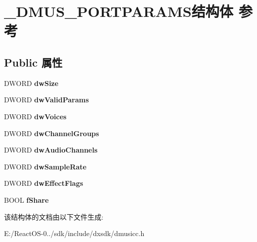 \hypertarget{struct___d_m_u_s___p_o_r_t_p_a_r_a_m_s}{}\section{\+\_\+\+D\+M\+U\+S\+\_\+\+P\+O\+R\+T\+P\+A\+R\+A\+M\+S结构体 参考}
\label{struct___d_m_u_s___p_o_r_t_p_a_r_a_m_s}
\subsection*{Public 属性}
\begin{DoxyCompactItemize}
\item 
\mbox{\label{struct___d_m_u_s___p_o_r_t_p_a_r_a_m_s_ab0468bac08902a2cbf407cf18308da29}} 
D\+W\+O\+RD {\bfseries dw\+Size}
\item 
\mbox{\label{struct___d_m_u_s___p_o_r_t_p_a_r_a_m_s_a9c53939e07ac75aa931ef05d9f62ede8}} 
D\+W\+O\+RD {\bfseries dw\+Valid\+Params}
\item 
\mbox{\label{struct___d_m_u_s___p_o_r_t_p_a_r_a_m_s_ad41e88cc02644ccf88471a5a329fd781}} 
D\+W\+O\+RD {\bfseries dw\+Voices}
\item 
\mbox{\label{struct___d_m_u_s___p_o_r_t_p_a_r_a_m_s_a807b6eeceeb3877d96b94cd14df0c71d}} 
D\+W\+O\+RD {\bfseries dw\+Channel\+Groups}
\item 
\mbox{\label{struct___d_m_u_s___p_o_r_t_p_a_r_a_m_s_aca3a65132a84db89d096705d2b6debf0}} 
D\+W\+O\+RD {\bfseries dw\+Audio\+Channels}
\item 
\mbox{\label{struct___d_m_u_s___p_o_r_t_p_a_r_a_m_s_a06a32126fcae8f1e2b9f396803c3fb82}} 
D\+W\+O\+RD {\bfseries dw\+Sample\+Rate}
\item 
\mbox{\label{struct___d_m_u_s___p_o_r_t_p_a_r_a_m_s_adda0f037a449c77636eea0fc1bd4d6d9}} 
D\+W\+O\+RD {\bfseries dw\+Effect\+Flags}
\item 
\mbox{\label{struct___d_m_u_s___p_o_r_t_p_a_r_a_m_s_a56be8c5e558ea41d0d47c55c5d30b31c}} 
B\+O\+OL {\bfseries f\+Share}
\end{DoxyCompactItemize}


该结构体的文档由以下文件生成\+:\begin{DoxyCompactItemize}
\item 
E\+:/\+React\+O\+S-\/0../sdk/include/dxsdk/dmusicc.\+h\end{DoxyCompactItemize}
